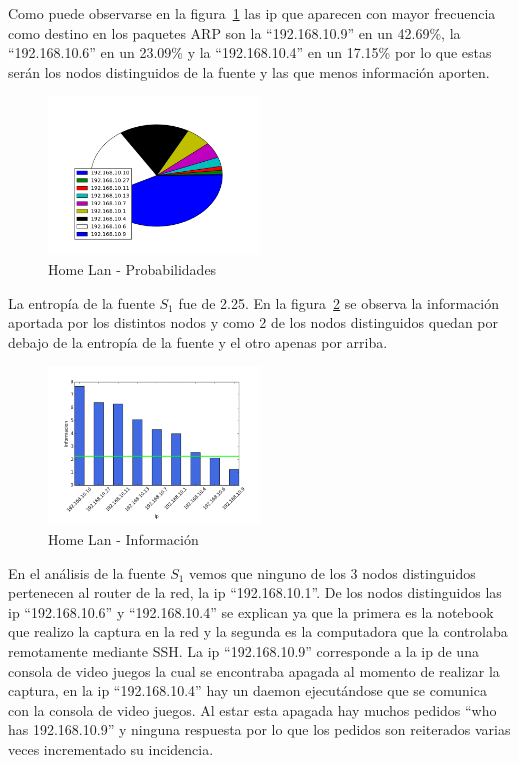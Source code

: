 \documentclass[final,inline,narroweqnarray,a4paper]{ieee}
\begin{document}
Como puede observarse en la figura~\ref{torta:homelanS1} las ip que aparecen con mayor frecuencia como destino en los paquetes ARP son la ``192.168.10.9'' en un 42.69\%, la ``192.168.10.6'' en un 23.09\% y la ``192.168.10.4'' en un 17.15\% por lo que estas serán los nodos distinguidos de la fuente y las que menos información aporten.

\begin{figure}[H]
    \begin{center}
        \includegraphics[width=0.5\textwidth]{plot/homelanS1-pie.png}
        \caption{Home Lan - Probabilidades}
        \label{torta:homelanS1}
    \end{center}
\end{figure} 

La entropía de la fuente $S_1$ fue de 2.25. En la figura~\ref{histo:homelanS1} se observa la información aportada por los distintos nodos y como 2 de los nodos distinguidos quedan por debajo de la entropía de la fuente y el otro apenas por arriba. 

\begin{figure}[H]
    \begin{center}
        \includegraphics[width=0.5\textwidth]{plot/homelanS1-bar.png}
        \caption{Home Lan - Información}
        \label{histo:homelanS1}
    \end{center}
\end{figure}

En el análisis de la fuente $S_1$ vemos que ninguno de los 3 nodos distinguidos pertenecen al router de la red, la ip ``192.168.10.1''. De los nodos distinguidos las ip ``192.168.10.6'' y ``192.168.10.4'' se explican ya que la primera es la notebook que realizo la captura en la red y la segunda es la computadora que la controlaba remotamente mediante SSH. La ip ``192.168.10.9'' corresponde a la ip de una consola de video juegos la cual se encontraba apagada al momento de realizar la captura, en la ip ``192.168.10.4'' hay un daemon ejecutándose que se comunica con la consola de video juegos. Al estar esta apagada hay muchos pedidos ``who has 192.168.10.9'' y ninguna respuesta por lo que los pedidos son reiterados varias veces incrementado su incidencia.
\end{document}
